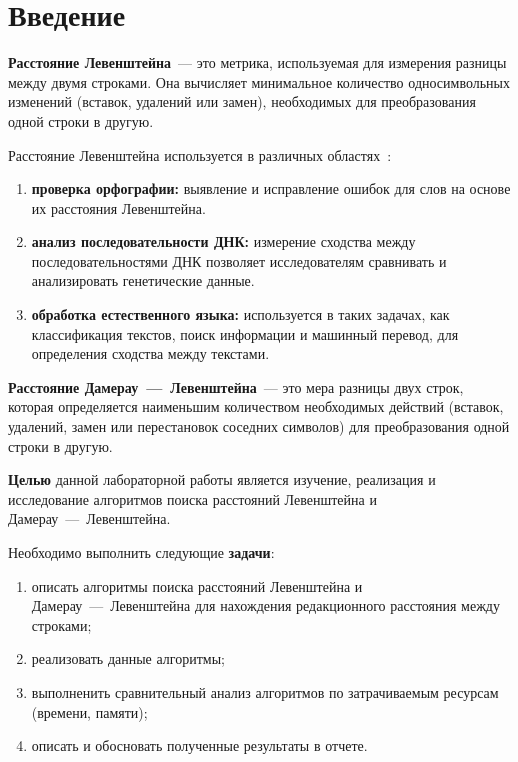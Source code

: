 \chapter*{Введение}

\textbf{Расстояние Левенштейна}~--- это метрика, используемая для измерения разницы между двумя строками. Она вычисляет минимальное количество односимвольных изменений (вставок, удалений или замен), необходимых для преобразования одной строки в другую.

Расстояние Левенштейна используется в различных областях~\cite{analysis-lev-damlev}:
\begin{enumerate}
    \item \textbf{проверка орфографии:} выявление и исправление ошибок для слов на основе их расстояния Левенштейна.
    \item \textbf{анализ последовательности ДНК:} измерение сходства между последовательностями ДНК позволяет исследователям сравнивать и анализировать генетические данные.
    \item \textbf{обработка естественного языка:} используется в таких задачах, как классификация текстов, поиск информации и машинный перевод, для определения сходства между текстами.
\end{enumerate}

\textbf{Расстояние Дамерау~---~Левенштейна}~--- это мера разницы двух строк, которая определяется наименьшим количеством необходимых действий (вставок, удалений, замен или перестановок соседних символов) для преобразования одной строки в другую.

\textbf{Целью} данной лабораторной работы является изучение, реализация и исследование алгоритмов поиска расстояний Левенштейна и Дамерау~---~Левенштейна.

Необходимо выполнить следующие \textbf{задачи}:
\begin{enumerate}[label={\arabic*)}]
    \item описать алгоритмы поиска расстояний Левенштейна и Дамерау~---~Левенштейна для нахождения редакционного расстояния между строками;
    \item реализовать данные алгоритмы;
    \item выполненить сравнительный анализ алгоритмов по затрачиваемым ресурсам (времени, памяти);
    \item описать и обосновать полученные результаты в отчете.
\end{enumerate}